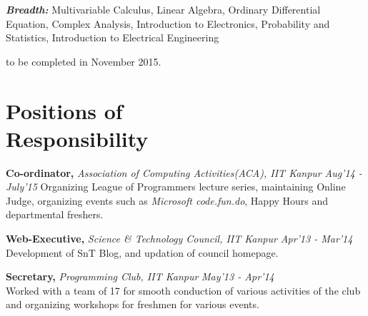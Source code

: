 \documentclass[margin,10pt]{resume}
\begin{document}
\begin{resume}
\begin{list2}
	\vspace{2mm}

	\item \emph{\textbf{Breadth:}} Multivariable Calculus, Linear Algebra, Ordinary Differential Equation, Complex Analysis, Introduction to Electronics, Probability and Statistics, Introduction to Electrical Engineering
\end{list2}
	{\vspace{-3mm}\hfill\small * to be completed in November 2015.}


\section{\mysidestyle Positions of\\Responsibility } 
\vspace{5mm}
\begin{list2}
\item \textbf{Co-ordinator,} \emph{Association of Computing Activities(ACA), IIT Kanpur} \hfill \emph{Aug'14 - July'15}
Organizing League of Programmers lecture series, maintaining Online Judge, organizing events such as \emph{Microsoft code.fun.do}, Happy Hours and departmental freshers. 
\vspace{2mm}
\item \textbf{Web-Executive,} \emph{Science \& Technology Council, IIT Kanpur} \hfill \emph{Apr'13 - Mar'14}\\
Development of SnT Blog, and updation of council homepage.

\vspace{2mm}
\item \textbf{Secretary,} \emph{Programming Club, IIT Kanpur}  \hfill \emph{May'13 - Apr'14} \\
Worked with a team of 17 for smooth conduction of various activities of the club and organizing workshops for freshmen for various events.

\end{list2}

\end{resume}
\end{document}
